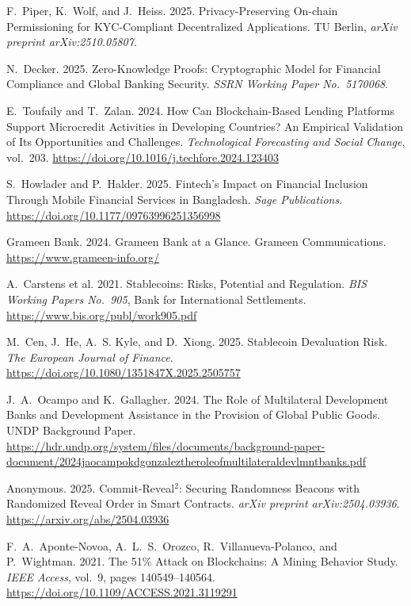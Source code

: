 \documentclass[12pt,a4paper]{report}
\begin{document}
{\begin{enumerate}[label={[\arabic*]}]
\item F.~Piper, K.~Wolf, and J.~Heiss. 2025. Privacy-Preserving On-chain Permissioning for KYC-Compliant Decentralized Applications. TU Berlin, \emph{arXiv preprint arXiv:2510.05807}.

\item N.~Decker. 2025. Zero-Knowledge Proofs: Cryptographic Model for Financial Compliance and Global Banking Security. \emph{SSRN Working Paper No.~5170068}.

\item E.~Toufaily and T.~Zalan. 2024. How Can Blockchain-Based Lending Platforms Support Microcredit Activities in Developing Countries? An Empirical Validation of Its Opportunities and Challenges. \emph{Technological Forecasting and Social Change}, vol.~203. \url{https://doi.org/10.1016/j.techfore.2024.123403}

\item S.~Howlader and P.~Halder. 2025. Fintech's Impact on Financial Inclusion Through Mobile Financial Services in Bangladesh. \emph{Sage Publications}. \url{https://doi.org/10.1177/09763996251356998}

\item Grameen Bank. 2024. Grameen Bank at a Glance. Grameen Communications. \url{https://www.grameen-info.org/}

\item A.~Carstens et al. 2021. Stablecoins: Risks, Potential and Regulation. \emph{BIS Working Papers No.~905}, Bank for International Settlements. \url{https://www.bis.org/publ/work905.pdf}

\item M.~Cen, J.~He, A.~S. Kyle, and D.~Xiong. 2025. Stablecoin Devaluation Risk. \emph{The European Journal of Finance}. \url{https://doi.org/10.1080/1351847X.2025.2505757}

\item J.~A.~Ocampo and K.~Gallagher. 2024. The Role of Multilateral Development Banks and Development Assistance in the Provision of Global Public Goods. UNDP Background Paper. \url{https://hdr.undp.org/system/files/documents/background-paper-document/2024jaocampokdgonzaleztheroleofmultilateraldevlmntbanks.pdf}

\item Anonymous. 2025. Commit-Reveal$^2$: Securing Randomness Beacons with Randomized Reveal Order in Smart Contracts. \emph{arXiv preprint arXiv:2504.03936}. \url{https://arxiv.org/abs/2504.03936}

\item F.~A.~Aponte-Novoa, A.~L.~S.~Orozco, R.~Villanueva-Polanco, and P.~Wightman. 2021. The 51\% Attack on Blockchains: A Mining Behavior Study. \emph{IEEE Access}, vol.~9, pages 140549--140564. \url{https://doi.org/10.1109/ACCESS.2021.3119291}


\end{enumerate}}
\end{document}
